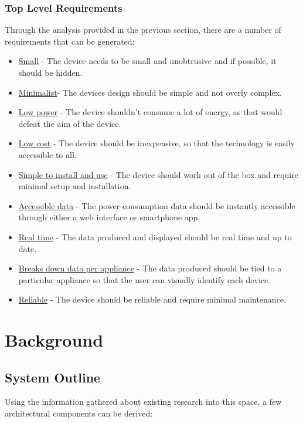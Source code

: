 \documentclass[draft,preprint,12pt,3p]{elsarticle}
\begin{document}
\subsubsection{Top Level Requirements}

Through the analysis provided in the previous section, there are a number of requirements that can be generated:

\begin{itemize}
  \item \underline{Small} - The device needs to be small and unobtrusive and if possible, it should be hidden.
  \item \underline{Minimalist}- The devices design should be simple and not overly complex.
  \item \underline{Low power} - The device shouldn't consume a lot of energy, as that would defeat the aim of the device.
  \item \underline{Low cost} - The device should be inexpensive, so that the technology is easily accessible to all.
  \item \underline{Simple to install and use} - The device should work out of the box and require minimal setup and installation.
  \item \underline{Accessible data}  - The power consumption data should be instantly accessible through either a web interface or smartphone app.
  \item \underline{Real time} - The data produced and displayed should be real time and up to date.
  \item \underline{Breaks down data per appliance} - The data produced should be tied to a particular appliance so that the user can visually identify each device.
  \item \underline{Reliable} - The device should be reliable and require minimal maintenance.
\end{itemize}

\clearpage
\section{Background}
\subsection{System Outline}
Using the information gathered about existing research into this space, a few architectural components can be derived:
\end{document}
